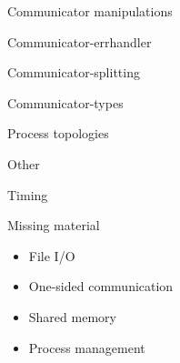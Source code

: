 \documentclass[11pt,headernav]{beamer}
\begin{document}
 {Communicator manipulations}

\begin{frame}[containsverbatim]{Communicator-errhandler}
  
\end{frame}
\begin{frame}[containsverbatim]{Communicator-splitting}
  
\end{frame}
\begin{frame}[containsverbatim]{Communicator-types}
  
\end{frame}

 {Process topologies}

 {Other}

\begin{frame}[containsverbatim]{Timing}
  
\end{frame}

\begin{frame}{Missing material}
  \begin{itemize}
  \item File I/O
  \item One-sided communication
  \item Shared memory
  \item Process management
  \end{itemize}
\end{frame}

\begin{comment}
  \Level 0 {MPI File I/O}
  \Level 0 {One-sided communication}
  \Level 0 {Shared memory}
  \Level 0 {Process management}
\end{comment}
\end{document}
